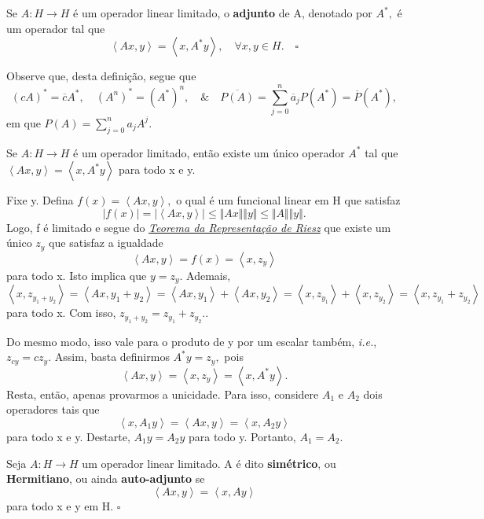 \documentclass[measure_theory.tex]{subfiles}
\begin{document}
\begin{def*}
	Se \(A:H\rightarrow H\) é um operador linear limitado, o \textbf{adjunto} de A, denotado por \(A^{*},\) é um operador tal que
	\[
		\left< Ax, y \right> = \left<  x, A^{*}y \right>,\quad \forall x, y\in H.\quad \square
	\]
\end{def*}
Observe que, desta definição, segue que
\[
	(cA)^{*} = \overline{c}A^{*},\quad (A^{n})^{*} = (A^{*})^{n},\quad\&\quad \overline{P(A)} = \sum\limits_{j=0}^{n}\overline{a}_{j}P(A^{*}) = \overline{P}(A^{*}),
\]
em que \(P(A) = \sum\limits_{j=0}^{n}a_{j}A^{j}\).

\begin{prop*}
	Se \(A:H\rightarrow H\) é um operador limitado, então existe um único operador \(A^{*}\) tal que \(\left< Ax, y \right> = \left< x, A^{*}y \right>\) para todo x e y.
\end{prop*}
\begin{proof*}
	Fixe y. Defina \(f(x) = \left< Ax, y \right>,\) o qual é um funcional linear em H que satisfaz
	\[
		|f(x)| = |\left< Ax, y \right>|\leq \Vert Ax \Vert\Vert y \Vert \leq \Vert A \Vert\Vert y \Vert.
	\]
	Logo, f é limitado e segue do \hyperlink{riesz_representation}{\textit{Teorema da Representação de Riesz}} que existe um único \(z_{y}\) que satisfaz a igualdade
	\[
		\left< Ax, y \right> = f(x) = \left< x, z_{y} \right>
	\]
	para todo x. Isto implica que \(y = z_{y}\). Ademais,
	\[
		\left< x, z_{y_1 + y_2} \right> = \left< Ax, y_1 + y_2 \right> = \left< Ax, y_1 \right> + \left< Ax, y_2 \right> = \left< x, z_{y_1} \right> + \left< x, z_{y_2} \right> = \left< x, z_{y_1} + z_{y_2} \right>
	\]
	para todo x. Com isso, \(z_{y_1 + y_2} = z_{y_{1}} + z_{y_2}.\).

	Do mesmo modo, isso vale para o produto de y por um escalar também, \textit{i.e.}, \(z_{cy} = cz_{y}.\) Assim, basta definirmos \(A^{*}y = z_{y},\) pois
	\[
		\left< Ax, y \right> = \left< x, z_{y} \right> = \left< x, A^{*}y \right>.
	\]
	Resta, então, apenas provarmos a unicidade. Para isso, considere \(A_1\) e \(A_2\) dois operadores tais que
	\[
		\left< x, A_1y \right> = \left< Ax, y \right> = \left< x, A_2 y \right>
	\]
	para todo x e y. Destarte, \(A_1 y = A_2y\) para todo y. Portanto, \(A_1 = A_2\). \qedsymbol
\end{proof*}
\begin{def*}
	Seja \(A:H\rightarrow H\) um operador linear limitado. A é dito \textbf{simétrico}, ou \textbf{Hermitiano}, ou ainda \textbf{auto-adjunto} se
	\[
		\left< Ax, y \right> = \left< x, Ay \right>
	\]
	para todo x e y em H. \(\square\)
\end{def*}
\end{document}
